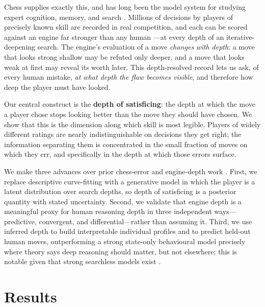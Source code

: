 \documentclass[11pt]{article}
\begin{document}
Chess supplies exactly this, and has long been the model system for studying expert cognition,
memory, and search \citep{degroot1965,newell1972,chase1973,gobet1996,ericsson1993}. Millions of
decisions by players of precisely known skill are recorded in real competition, and each can be
scored against an engine far stronger than any human \citep{campbell2002,silver2018}---at every
depth of an iterative-deepening search. The engine's evaluation of a move
\emph{changes with depth}: a move that looks strong shallow may be refuted only deeper, and a
move that looks weak at first may reveal its worth later. This depth-resolved record lets us
ask, of every human mistake, \emph{at what depth the flaw becomes visible}, and therefore how
deep the player must have looked.

Our central construct is the \textbf{depth of satisficing}: the depth at which the move a
player chose stops looking better than the move they should have chosen. We show that this is
the dimension along which skill is most legible. Players of widely different ratings are
nearly indistinguishable on decisions they get right; the information separating them is
concentrated in the small fraction of moves on which they err, and specifically in the depth
at which those errors surface.

We make three advances over prior chess-error and engine-depth work
\citep{regan2011,biswas2015,mcilroyyoung2020}. First, we replace descriptive curve-fitting
with a generative model in which the player is a latent distribution over search depths, so
depth of satisficing is a posterior quantity with stated uncertainty. Second, we validate
that engine depth is a meaningful proxy for human reasoning depth in three independent
ways---predictive, convergent, and differential---rather than assuming it. Third, we use
inferred depth to build interpretable individual profiles and to predict held-out human
moves, outperforming a strong state-only behavioural model precisely where theory says deep
reasoning should matter, but not elsewhere; this is notable given that strong searchless
models exist \citep{ruoss2024}.

\section{Results}
\end{document}
